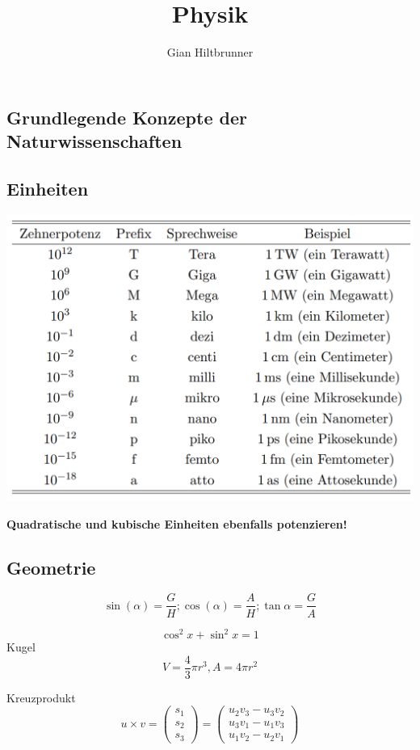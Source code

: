 \documentclass{article}
\begin{document}
\begin{multicols*}{3}


\title{Physik}
\author{Gian Hiltbrunner}
\maketitle

\section{Grundlegende Konzepte der Naturwissenschaften}
  \subsection{Einheiten}

  \includegraphics[scale=0.22, angle=0]{units}

  \textbf{Quadratische und kubische Einheiten ebenfalls potenzieren!}

  \subsection{Geometrie}
    $$\sin(\alpha) = \frac{G}{H};
    \cos(\alpha) = \frac{A}{H};
    \tan{\alpha} = \frac{G}{A}$$

    $$\cos ^2{x}+\sin ^2{x} = 1$$
    Kugel
    $$V=\frac{4}{3}\pi r ^3, A= 4\pi r^2$$

    Kreuzprodukt
    $$u\times v={\begin{pmatrix}s_{1}\\s_{2}\\s_{3}\end{pmatrix}}={\begin{pmatrix}u_{2}v_{3}-u_{3}v_{2}\\u_{3}v_{1}-u_{1}v_{3}\\u_{1}v_{2}-u_{2}v_{1}\end{pmatrix}}$$


\end{multicols*}
\end{document}
